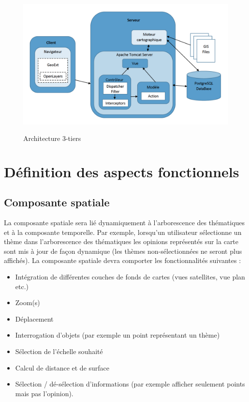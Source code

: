 \begin{center}
\begin{figure}[H] \centering
\includegraphics[width=19cm]{archi2.png}\\
\caption{\label{archi2} Architecture 3-tiers}
\end{figure}
\end{center}


\section{Définition des aspects fonctionnels} \label{Fonctionnels}

\subsection{Composante spatiale}

La composante spatiale sera lié dynamiquement à l'arborescence des thématiques et à la composante temporelle. Par exemple, lorsqu'un utilisateur sélectionne un thème dans l'arborescence des thématiques les opinions représentés sur la carte sont mis à jour de façon dynamique (les  thèmes non-sélectionnées ne seront plus affichés). La composante spatiale devra comporter les fonctionnalités suivantes :

\begin{itemize}

\item Intégration de différentes couches de fonds de cartes (vues satellites, vue plan etc.)
\item Zoom(s)
\item Déplacement
\item Interrogation d'objets (par exemple un point représentant un thème)
\item Sélection de l'échelle souhaité
\item Calcul de distance et de surface
\item Sélection / dé-sélection d'informations (par exemple afficher seulement points mais pas l'opinion).
\end{itemize}  



